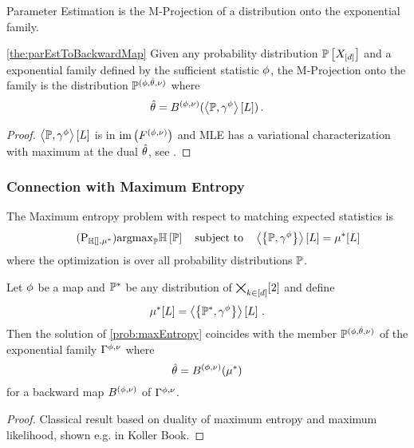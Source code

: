 
Parameter Estimation is the M-Projection of a distribution onto the exponential family.

\begin{theorem}\ref{the:parEstToBackwardMap}
	Given any probability distribution $\mathbb{P}\left[X_{[d]}\right]$ and a exponential family defined by the sufficient statistic $\phi$, the M-Projection onto the family is the distribution $\mathbb{P}^{(\phi,\hat{\theta},\nu)}$ where
	\begin{align*}
		\hat{\theta} = B^{(\phi,\nu)}(\left\langle \mathbb{P},\gamma^{\phi}\right\rangle \left[ L \right]) \, .
	\end{align*}
\end{theorem}
\begin{proof}
	$\left\langle \mathbb{P},\gamma^{\phi}\right\rangle \left[ L \right]$ is in $\mathrm{im}\left(F^{(\phi,\nu)}\right)$ and MLE has a variational characterization with maximum at the dual $\hat{\theta}$, see \cite{wainwright_graphical_2008}.
\end{proof}





\subsubsection{Connection with Maximum Entropy}\label{sec:maxEntDuality}


The Maximum entropy problem with respect to matching expected statistics is
\begin{align}\tag{$\mathrm{P}_{\sentropyof{}, \genmean}$}\label{prob:maxEntropy}
	\argmax_{\probtensor} \sentropyof{\probtensor} \quad \text{subject to} \quad 
	 \sbcontractionof{\probtensor,\sencsstat}{\selvariable} =  \genmeanat{\selvariable}
\end{align}
where the optimization is over all probability distributions $\mathbb{P}$.


\begin{theorem}\label{the:maxEntMaxLikeDuality}
	Let $\phi$ be a map and $\mathbb{P}^*$ be any distribution of $\bigtimes_{k\in[d]}[2]$ and define
		\[ \mu^*[L] = \left\langle \left\{\mathbb{P}^*,\gamma^{\phi}\right\}\right\rangle \left[ L \right] \, .  \]
	Then the solution of \ref{prob:maxEntropy} coincides with the member $\mathbb{P}^{(\phi,\hat{\theta},\nu)}$ of the exponential family $\Gamma^{\phi,\nu}$ where
		\[ \hat{\theta} = B^{(\phi,\nu)}(\mu^*) \]
	for a backward map $B^{(\phi,\nu)}$ of $\Gamma^{\phi,\nu}$.
\end{theorem}
\begin{proof}
	Classical result based on duality of maximum entropy and maximum likelihood, shown e.g. in Koller Book.
\end{proof}

